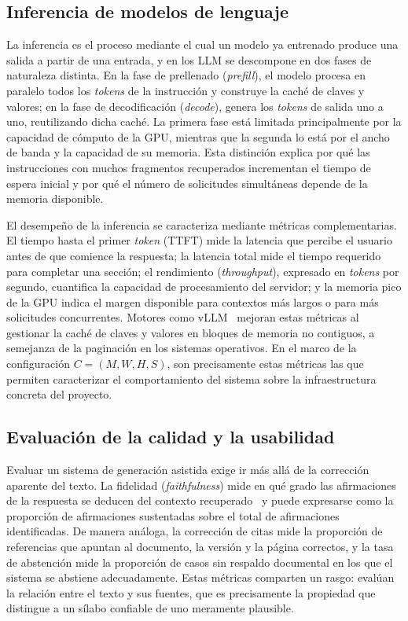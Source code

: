 \subsection{Inferencia de modelos de lenguaje}
La inferencia es el proceso mediante el cual un modelo ya entrenado produce una salida a partir de una entrada, y en los LLM se descompone en dos fases de naturaleza distinta. En la fase de prellenado (\textit{prefill}), el modelo procesa en paralelo todos los \textit{tokens} de la instrucción y construye la caché de claves y valores; en la fase de decodificación (\textit{decode}), genera los \textit{tokens} de salida uno a uno, reutilizando dicha caché. La primera fase está limitada principalmente por la capacidad de cómputo de la GPU, mientras que la segunda lo está por el ancho de banda y la capacidad de su memoria. Esta distinción explica por qué las instrucciones con muchos fragmentos recuperados incrementan el tiempo de espera inicial y por qué el número de solicitudes simultáneas depende de la memoria disponible.

El desempeño de la inferencia se caracteriza mediante métricas complementarias. El tiempo hasta el primer \textit{token} (TTFT) mide la latencia que percibe el usuario antes de que comience la respuesta; la latencia total mide el tiempo requerido para completar una sección; el rendimiento (\textit{throughput}), expresado en \textit{tokens} por segundo, cuantifica la capacidad de procesamiento del servidor; y la memoria pico de la GPU indica el margen disponible para contextos más largos o para más solicitudes concurrentes. Motores como vLLM~\cite{kwon2023vllm} mejoran estas métricas al gestionar la caché de claves y valores en bloques de memoria no contiguos, a semejanza de la paginación en los sistemas operativos. En el marco de la configuración $C = (M, W, H, S)$, son precisamente estas métricas las que permiten caracterizar el comportamiento del sistema sobre la infraestructura concreta del proyecto.

\subsection{Evaluación de la calidad y la usabilidad}
Evaluar un sistema de generación asistida exige ir más allá de la corrección aparente del texto. La fidelidad (\textit{faithfulness}) mide en qué grado las afirmaciones de la respuesta se deducen del contexto recuperado~\cite{es2024ragas} y puede expresarse como la proporción de afirmaciones sustentadas sobre el total de afirmaciones identificadas. De manera análoga, la corrección de citas mide la proporción de referencias que apuntan al documento, la versión y la página correctos, y la tasa de abstención mide la proporción de casos sin respaldo documental en los que el sistema se abstiene adecuadamente. Estas métricas comparten un rasgo: evalúan la relación entre el texto y sus fuentes, que es precisamente la propiedad que distingue a un sílabo confiable de uno meramente plausible.

